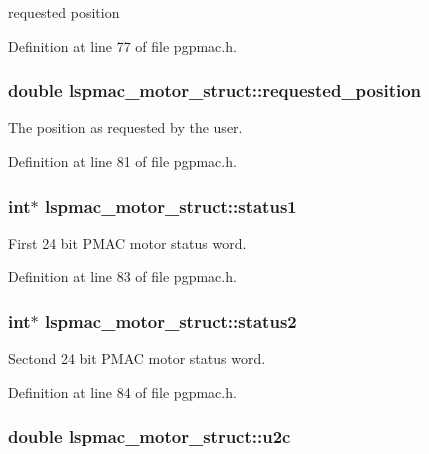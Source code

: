requested position 

Definition at line 77 of file pgpmac.h.\hypertarget{structlspmac__motor__struct_af8cdc94c6e2478b12ce942d4cf1d7499}{
\subsubsection[{requested\_\-position}]{\setlength{\rightskip}{0pt plus 5cm}double {\bf lspmac\_\-motor\_\-struct::requested\_\-position}}}
\label{structlspmac__motor__struct_af8cdc94c6e2478b12ce942d4cf1d7499}


The position as requested by the user. 

Definition at line 81 of file pgpmac.h.\hypertarget{structlspmac__motor__struct_a17e0953d269d53137c508e391cb16e47}{
\subsubsection[{status1}]{\setlength{\rightskip}{0pt plus 5cm}int$\ast$ {\bf lspmac\_\-motor\_\-struct::status1}}}
\label{structlspmac__motor__struct_a17e0953d269d53137c508e391cb16e47}


First 24 bit PMAC motor status word. 

Definition at line 83 of file pgpmac.h.\hypertarget{structlspmac__motor__struct_ac16fec220714218334764a1038f3813a}{
\subsubsection[{status2}]{\setlength{\rightskip}{0pt plus 5cm}int$\ast$ {\bf lspmac\_\-motor\_\-struct::status2}}}
\label{structlspmac__motor__struct_ac16fec220714218334764a1038f3813a}


Sectond 24 bit PMAC motor status word. 

Definition at line 84 of file pgpmac.h.\hypertarget{structlspmac__motor__struct_a61415627ab2dc0f438b190d117e532db}{
\subsubsection[{u2c}]{\setlength{\rightskip}{0pt plus 5cm}double {\bf lspmac\_\-motor\_\-struct::u2c}}}
\label{structlspmac__motor__struct_a61415627ab2dc0f438b190d117e532db}



